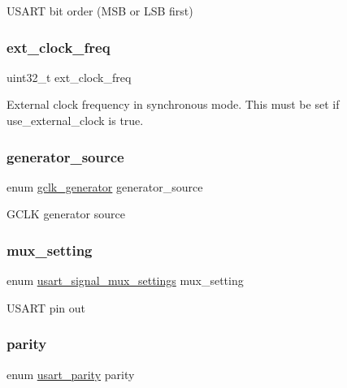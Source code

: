 U\+S\+A\+RT bit order (M\+SB or L\+SB first) \mbox{\label{structusart__config_a0207dab3adef604c14018e51f33ababd}} 
\subsubsection{\texorpdfstring{ext\_clock\_freq}{ext\_clock\_freq}}
{\footnotesize\ttfamily uint32\+\_\+t ext\+\_\+clock\+\_\+freq}

External clock frequency in synchronous mode. This must be set if {\ttfamily use\+\_\+external\+\_\+clock} is true. \mbox{\label{structusart__config_a2dba667c6d06bff254b7284d45dd02a3}} 
\subsubsection{\texorpdfstring{generator\_source}{generator\_source}}
{\footnotesize\ttfamily enum \mbox{\hyperlink{group__asfdoc__sam0__system__clock__group_ga1ab9bb87560ad127ed982591b7d67311}{gclk\+\_\+generator}} generator\+\_\+source}

G\+C\+LK generator source \mbox{\label{structusart__config_aaa7bd399d02871be8e083486224d99c5}} 
\subsubsection{\texorpdfstring{mux\_setting}{mux\_setting}}
{\footnotesize\ttfamily enum \mbox{\hyperlink{group__asfdoc__sam0__sercom__usart__group_ga87bbdb9f7edb3f1866aeb498bf7c9077}{usart\+\_\+signal\+\_\+mux\+\_\+settings}} mux\+\_\+setting}

U\+S\+A\+RT pin out \mbox{\label{structusart__config_a4fe46d461602152192b62616aa456d03}} 
\subsubsection{\texorpdfstring{parity}{parity}}
{\footnotesize\ttfamily enum \mbox{\hyperlink{group__asfdoc__sam0__sercom__usart__group_ga867cc5f0ea7d3bf651d68f0046cf6f41}{usart\+\_\+parity}} parity}

